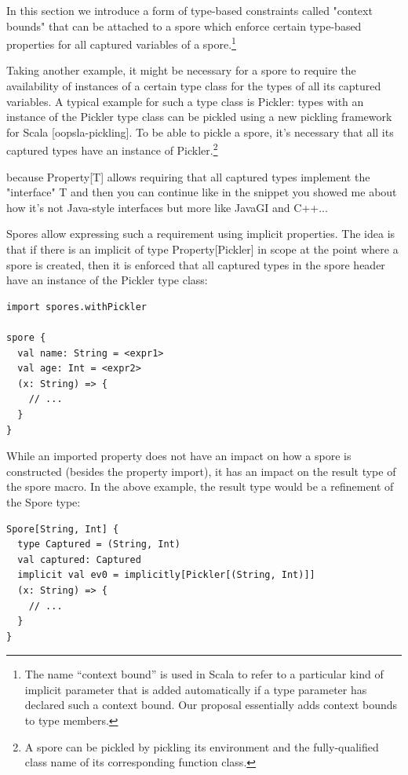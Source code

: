 \documentclass{llncs}
\begin{document}
In this section we introduce a form of type-based constraints called "context bounds" that can be attached to a spore which enforce certain type-based properties for all captured variables of a spore.\footnote{The name ``context bound'' is used in Scala to refer to a particular kind of implicit parameter that is added automatically if a type parameter has declared such a context bound. Our proposal essentially adds context bounds to type members.}

Taking another example, it might be necessary for a spore to require the availability of instances of a certain type class for the types of all its captured variables. A typical example for such a type class is Pickler: types with an instance of the Pickler type class can be pickled using a new pickling framework for Scala [oopsla-pickling]. To be able to pickle a spore, it's necessary that all its captured types have an instance of Pickler.\footnote{A spore can be pickled by pickling its environment and the fully-qualified class name of its corresponding function class.}

because Property[T] allows requiring that all captured types implement the "interface" T
and then you can continue like in the snippet you showed me about how it's not Java-style interfaces but more like JavaGI and C++...

Spores allow expressing such a requirement using implicit properties. The idea is that if there is an implicit of type Property[Pickler] in scope at the point where a spore is created, then it is enforced that all captured types in the spore header have an instance of the Pickler type class:

\begin{lstlisting}
import spores.withPickler

spore {
  val name: String = <expr1>
  val age: Int = <expr2>
  (x: String) => {
    // ...
  }
}
\end{lstlisting}

While an imported property does not have an impact on how a spore is constructed (besides the property import), it has an impact on the result type of the spore macro. In the above example, the result type would be a refinement of the Spore type:

\begin{lstlisting}
Spore[String, Int] {
  type Captured = (String, Int)
  val captured: Captured
  implicit val ev0 = implicitly[Pickler[(String, Int)]]
  (x: String) => {
    // ...
  }
}
\end{lstlisting}
\end{document}
